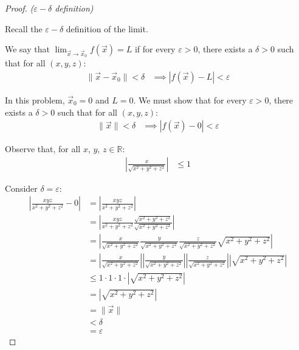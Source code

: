 \begin{proof}
\textit{(\(\varepsilon - \delta\) definition)} 

Recall the \(\varepsilon - \delta\) definition of the limit. 

We say that \(\displaystyle \lim_{\vec{x} \rightarrow \vec{x}_0} f(\vec{x}) = L\) if for every \(\varepsilon > 0\), there exists a \(\delta > 0\) such that for all \((x, y, z)\):
\begin{align}
    \|\vec{x} - \vec{x}_0\| < \delta &\implies |f(\vec{x}) - L| < \varepsilon
\end{align}

In this problem, \(\vec{x}_0 = 0\) and \(L = 0\). We must show that for every \(\varepsilon > 0\), there exists a \(\delta > 0\) such that for all \((x, y, z)\):
\begin{align}
    \|\vec{x}\| < \delta &\implies |f(\vec{x}) - 0| < \varepsilon
\end{align}

Observe that, for all \(x\), \(y\), \(z \in \mathbb{R}\):
\begin{align}
    \left|\frac{x}{\sqrt{x^2 + y^2 + z^2}}\right| &\leq 1
\end{align}

Consider \(\delta = \varepsilon\):
\begin{align*}
    \left|\frac{xyz}{x^2 + y^2 + z^2} - 0\right| &= \left|\frac{xyz}{x^2 + y^2 + z^2}\right| \\
    &= \left|\frac{xyz}{x^2 + y^2 + z^2}\frac{\sqrt{x^2 + y^2 + z^2}}{\sqrt{x^2 + y^2 + z^2}}\right| \\
    &= \left|\frac{x}{\sqrt{x^2 + y^2 + z^2}}\frac{y}{\sqrt{x^2 + y^2 + z^2}}\frac{z}{\sqrt{x^2 + y^2 + z^2}}\sqrt{x^2 + y^2 + z^2}\right| \\
    &= \left|\frac{x}{\sqrt{x^2 + y^2 + z^2}}\right|\left|\frac{y}{\sqrt{x^2 + y^2 + z^2}}\right|\left|\frac{z}{\sqrt{x^2 + y^2 + z^2}}\right|\left|\sqrt{x^2 + y^2 + z^2}\right| \\
    &\leq 1 \cdot 1 \cdot 1 \cdot \left|\sqrt{x^2 + y^2 + z^2}\right| \\
    &= \left|\sqrt{x^2 + y^2 + z^2}\right| \\
    &= \|\vec{x}\| \\
    &< \delta \\
    &= \varepsilon
\end{align*}
\end{proof}

